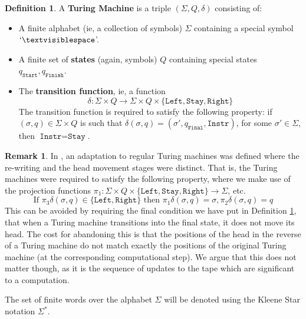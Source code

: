 \documentclass[12pt]{article}
\theoremstyle{plain}
\theoremstyle{definition}
\newtheorem{defn}[thm]{Definition} %
\newtheorem{remark}[thm]{Remark}
\newcommand{\lto}{\longrightarrow}
\begin{document}
	\begin{defn}\label{def:Turing_machine}
		A \textbf{Turing Machine} is a triple $(\Sigma, Q, \delta)$ consisting of:
		\begin{itemize}
			\item A finite alphabet (ie, a collection of symbols) $\Sigma$ containing a special symbol $`\textvisiblespace$'.
			\item A finite set of \textbf{states} (again, symbols) $Q$ containing special states $q_{\texttt{Start}}, q_{\texttt{Finish}}$.
			\item The \textbf{transition function}, ie, a function
			\begin{equation}
				\delta: \Sigma \times Q \lto \Sigma \times Q \times \lbrace \texttt{Left}, \texttt{Stay}, \texttt{Right}\rbrace
				\end{equation}
			The transition function is required to satisfy the following property: if $(\sigma, q) \in \Sigma \times Q$ is such that $\delta(\sigma, q) = (\sigma', q_{\texttt{Final}}, \texttt{Instr})$, for some $\sigma' \in \Sigma$, then $\texttt{Instr} = \texttt{Stay}$.
			\end{itemize}
		\end{defn}
	\begin{remark}\label{rmk:polite_avoidance}
		In \cite{Bennett}, \cite{Troiani} an adaptation to regular Turing machines was defined where the re-writing and the head movement stages were distinct. That is, the Turing machines were required to satisfy the following property, where we make use of the projection functions $\pi_1: \Sigma \times Q \times \{\texttt{Left},\texttt{Stay}, \texttt{Right}\} \lto \Sigma$, etc.
		\begin{equation}
			\text{If }\pi_3\delta(\sigma, q) \in \lbrace \texttt{Left}, \texttt{Right}\rbrace \text{ then } \pi_1\delta(\sigma, q) = \sigma, \pi_2\delta(\sigma, q) = q
		\end{equation}
	This can be avoided by requiring the final condition we have put in Definition \ref{def:Turing_machine}, that when a Turing machine transitions into the final state, it does not move its head. The cost for abandoning this is that the positions of the head in the reverse of a Turing machine do not match exactly the positions of the original Turing machine (at the corresponding computational step). We argue that this does not matter though, as it is the sequence of updates to the tape which are significant to a computation.
		\end{remark}
	The set of finite words over the alphabet $\Sigma$ will be denoted using the Kleene Star notation $\Sigma^\ast$.
	
\end{document}
